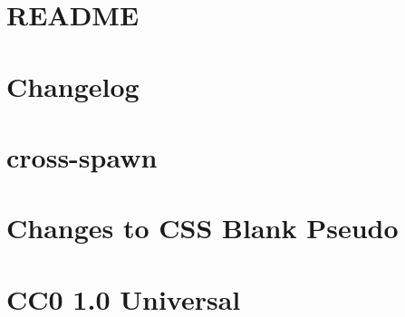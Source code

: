\documentclass[twoside]{book}
\newcommand{\+}{\discretionary{\mbox{\scriptsize$\hookleftarrow$}}{}{}}
\begin{document}
\chapter{README}
\label{md__c___users_vaishnavi_jadhav__desktop__developer_code_mean_stack_example_client_node_modules_critters__r_e_a_d_m_e}

\chapter{Changelog}
\label{md__c___users_vaishnavi_jadhav__desktop__developer_code_mean_stack_example_client_node_modules_cross_spawn__c_h_a_n_g_e_l_o_g}

\chapter{cross-\/spawn}
\label{md__c___users_vaishnavi_jadhav__desktop__developer_code_mean_stack_example_client_node_modules_cross_spawn__r_e_a_d_m_e}

\chapter{Changes to CSS Blank Pseudo}
\label{md__c___users_vaishnavi_jadhav__desktop__developer_code_mean_stack_example_client_node_modules_c5756e230f027cdeb84ef0b050e3a1e89}

\chapter{CC0 1.0 Universal}
\label{md__c___users_vaishnavi_jadhav__desktop__developer_code_mean_stack_example_client_node_modules_css_blank_pseudo__l_i_c_e_n_s_e}

\end{document}
